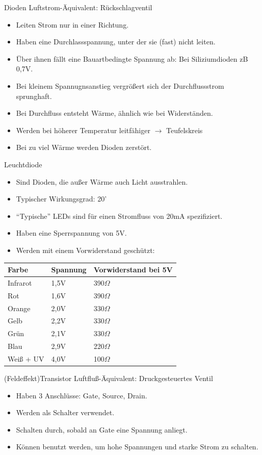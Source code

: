 \documentclass[12pt]{beamer}
\begin{document}
\begin{frame}{Dioden}
Luftstrom-Äquivalent: Rückschlagventil
\begin{itemize}
\item Leiten Strom nur in einer Richtung.
\item Haben eine Durchlassspannung, unter der sie (fast) nicht leiten.
\item Über ihnen fällt eine Bauartbedingte Spannung ab: Bei Siliziumdioden zB 0,7V.
\item Bei kleinem Spannugnsanstieg vergrößert sich der Durchflussstrom sprunghaft.
\item Bei Durchfluss entsteht Wärme, ähnlich wie bei Widerständen.
\item Werden bei höherer Temperatur leitfähiger $\rightarrow$ Teufelskreis
\item Bei zu viel Wärme werden Dioden zerstört.
\end{itemize}
\end{frame}

\begin{frame}{Leuchtdiode}
\begin{itemize}
\item Sind Dioden, die außer Wärme auch Licht ausstrahlen.
\item Typischer Wirkungsgrad: 20’%
\item “Typische” LEDs sind für einen Stromfluss von 20mA spezifiziert.
\item Haben eine Sperrspannung von 5V.
\item Werden mit einem Vorwiderstand geschützt:
\end{itemize}
\begin{tabular}{|l|l|l|}
Farbe     & Spannung & Vorwiderstand bei 5V \\
\hline
Infrarot  & 1,5V     & 390$\Omega$ \\
Rot       & 1,6V     & 390$\Omega$ \\
Orange    & 2,0V     & 330$\Omega$ \\
Gelb      & 2,2V     & 330$\Omega$ \\
Grün      & 2,1V     & 330$\Omega$ \\
Blau      & 2,9V     & 220$\Omega$ \\
Weiß + UV & 4,0V     & 100$\Omega$ \\
\end{tabular}
\end{frame}

\begin{frame}{(Feldeffekt)Transistor}
Luftfluß-Äquivalent: Druckgesteuertes Ventil
\begin{itemize}
\item Haben 3 Anschlüsse: Gate, Source, Drain.
\item Werden als Schalter verwendet.
\item Schalten durch, sobald an Gate eine Spannung anliegt.
\item Können benutzt werden, um hohe Spannungen und starke Strom zu schalten.
\end{itemize}
\end{frame}
\end{document}
